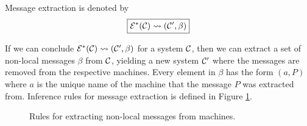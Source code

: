 Message extraction is denoted by
\begin{equation*}
\boxed{\mathcal{E}^*(\mathcal{C}) \leadsto (\mathcal{C}', \beta)}
\end{equation*}

If we can conclude $\mathcal{E}^*(\mathcal{C}) \leadsto (\mathcal{C}', \beta)$ for a system $\mathcal{C}$, then we
can extract a set of non-local messages $\beta$ from $\mathcal{C}$, yielding a new
system $\mathcal{C}'$ where the messages are removed from the respective machines. Every
element in $\beta$ has the form $(a, P)$ where $a$ is the unique name of the
machine that the message $P$ was extracted from. Inference rules for message
extraction is defined in Figure \ref{fig:rule:extract}.

\begin{figure}[!ht]
\caption{Rules for extracting non-local messages from machines.}\label{fig:rule:extract}
\end{figure}

